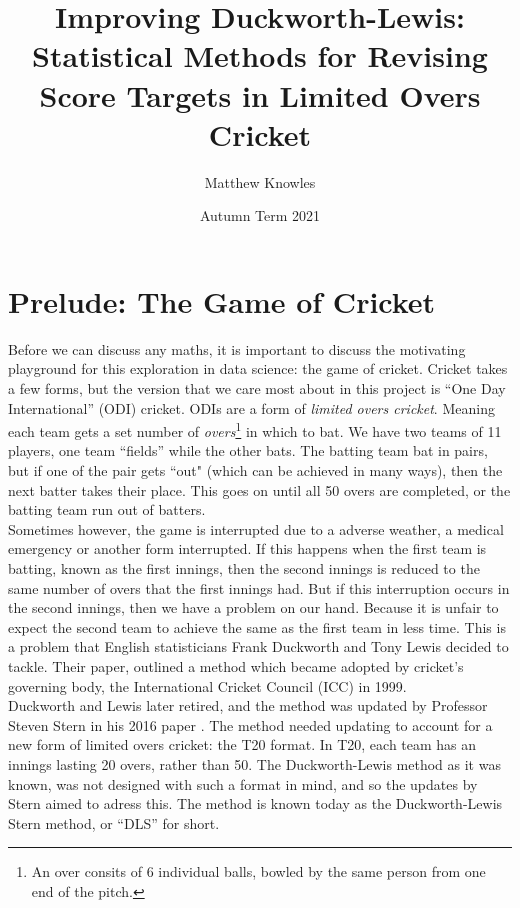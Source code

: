 \documentclass[11pt]{amsart}
\title[Improving DLS]{Improving Duckworth-Lewis: Statistical Methods for Revising Score Targets in Limited Overs Cricket}
\author{Matthew Knowles}
\date{Autumn Term 2021}
\begin{document}
\maketitle

\section{Prelude: The Game of Cricket}
Before we can discuss any maths, it is important to discuss the motivating playground for this exploration in data science: the game of cricket.
Cricket takes a few forms, but the version that we care most about in this project is ``One Day International'' (ODI) cricket. ODIs are a form of 
\textit{limited overs cricket}. Meaning each team gets a set number of \textit{overs}\footnote{An over consits of 6 individual balls, bowled by the same person from one end of the pitch.} in which to bat. We have two teams of 11 players, one team ``fields''
while the other bats. The batting team bat in pairs, but if one of the pair gets ``out" (which can be achieved in many ways), then the next batter takes their place.
This goes on until all 50 overs are completed, or the batting team run out of batters. \\

Sometimes however, the game is interrupted due to a adverse weather, a medical emergency or another form interrupted. If this happens when the first team is batting,
known as the first innings, then the second innings is reduced to the same number of overs that the first innings had. But if this interruption occurs in the second 
innings, then we have a problem on our hand. Because it is unfair to expect the second team to achieve the same as the first team in less time. 
This is a problem that English statisticians Frank Duckworth and Tony Lewis decided to tackle. Their paper, \cite{duckworth} outlined a method which became 
adopted by cricket's governing body, the International Cricket Council (ICC) in 1999. \\

Duckworth and Lewis later retired, and the method was updated by Professor Steven Stern in his 2016 paper \cite{stern}. The method needed
updating to account for a new form of limited overs cricket: the T20 format. In T20, each team has an innings lasting 20 overs, rather than 50. The Duckworth-Lewis method as it was known,
was not designed with such a format in mind, and so the updates by Stern aimed to adress this. The method is known today as the Duckworth-Lewis Stern method, or ``DLS'' for short.
\end{document}
